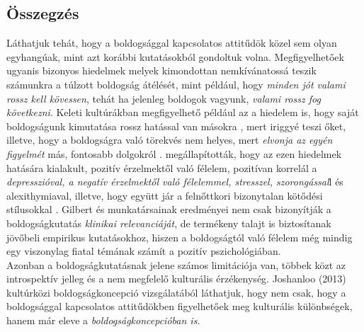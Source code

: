 \subsection*{Összegzés}
Láthatjuk tehát, hogy a boldogsággal kapcsolatos attitűdök közel sem olyan egyhangúak, mint azt korábbi kutatásokból gondoltuk volna. Megfigyelhetőek ugyanis bizonyos hiedelmek \parencite{joshanloo_weijers_2013} melyek kimondottan nemkívána\-tossá teszik számunkra a túlzott boldogság átélését, mint például, hogy \textit{minden jót valami rossz kell kövessen}, tehát ha jelenleg boldogok vagyunk, \textit{valami rossz fog következni}. Keleti kultúrák\-ban megfigyelhető például az a hiedelem is, hogy saját boldogságunk kimutatása rossz hatással van másokra \parencite{joshanloo_weijers_2013}, mert iriggyé teszi őket, illetve, hogy a boldogságra való törekvés nem helyes, mert \textit{elvonja az egyén figyelmét} más, fontosabb dolgokról \parencite{joshanloo_weijers_2013}. \textcite{gilbert_mcewan_catarino_baiao_palmeira_2013} megállapították, hogy az ezen hiedelmek hatására kialakult, pozitív érzelmektől való félelem, pozitívan korrelál a \textit{depresszióval, a negatív érzelmektől való félelemmel, stresszel, szorongással}l és alexithymiaval, illetve, hogy együtt jár a felnőttkori bizonytalan kötődési stílusokkal \parencite{gilbert_mcewan_catarino_baiao_palmeira_2013}. Gilbert és munkatársainak eredményei nem csak bizonyítják a boldogságkutatás \textit{klinikai relevanciáját}, de termékeny talajt is biztosítanak jövőbeli empirikus kutatásokhoz, hiszen a boldogságtól való félelem még mindig egy viszonylag fiatal témának számít a pozitív pszichológiában. \\
Azonban a boldogságkutatásnak jelene számos limitációja van, többek közt az introspektív jelleg és a nem megfelelő kulturális érzékenység. Joshanloo (2013) kultúrközi boldogságkoncepció vizsgálatából láthatjuk, hogy nem csak, hogy a boldog\-sággal kapcsolatos attitűdökben figyelhetőek meg kulturális különbségek, hanem már eleve a \textit{boldogságkoncepcióban is.}
\pagebreak












































